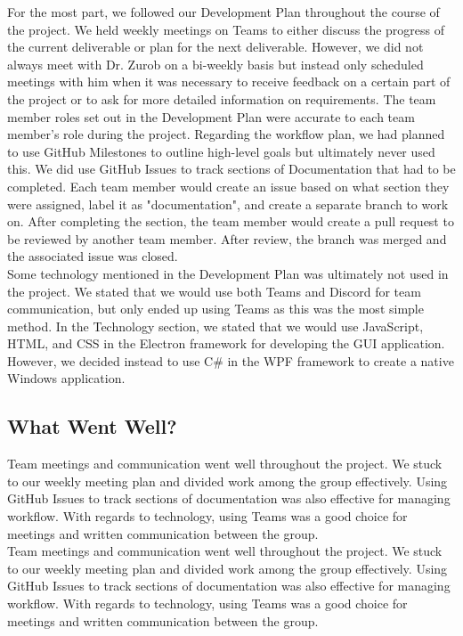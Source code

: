 \documentclass{article}
\begin{document}
\noindent For the most part, we followed our Development Plan throughout the course of the project. We held weekly meetings on Teams to either discuss the progress of the current deliverable or plan for the next deliverable. However, we did not always meet with Dr. Zurob on a bi-weekly basis but instead only scheduled meetings with him when it was necessary to receive feedback on a certain part of the project or to ask for more detailed information on requirements. The team member roles set out in the Development Plan were accurate to each team member's role during the project. Regarding the workflow plan, we had planned to use GitHub Milestones to outline high-level goals but ultimately never used this. We did use GitHub Issues to track sections of Documentation that had to be completed. Each team member would create an issue based on what section they were assigned, label it as "documentation", and create a separate branch to work on. After completing the section, the team member would create a pull request to be reviewed by another team member. After review, the branch was merged and the associated issue was closed. \\

\noindent Some technology mentioned in the Development Plan was ultimately not used in the project. We stated that we would use both Teams and Discord for team communication, but only ended up using Teams as this was the most simple method. In the Technology section, we stated that we would use JavaScript, HTML, and CSS in the Electron framework for developing the GUI application. However, we decided instead to use C# in the WPF framework to create a native Windows application. \\

\subsection{What Went Well?}


\noindent Team meetings and communication went well throughout the project. We stuck to our weekly meeting plan and divided work among the group effectively. Using GitHub Issues to track sections of documentation was also effective for managing workflow. With regards to technology, using Teams was a good choice for meetings and written communication between the group. \\
\noindent Team meetings and communication went well throughout the project. We stuck to our weekly meeting plan and divided work among the group effectively. Using GitHub Issues to track sections of documentation was also effective for managing workflow. With regards to technology, using Teams was a good choice for meetings and written communication between the group. \\
\end{document}
